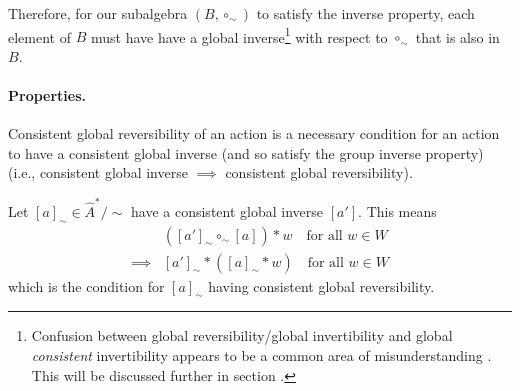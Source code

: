 Therefore, for our subalgebra $(B, \circ_{\sim})$ to satisfy the inverse property, each element of $B$ must have have a global inverse\footnote{
Confusion between global reversibility/global invertibility and global \emph{consistent} invertibility appears to be a common area of misunderstanding .
This will be discussed further in section .
} with respect to $\circ_{\sim}$ that is also in $B$.

\paragraph{Properties. }

\begin{propositionE}\label{prp:consistent_global_reversibility_necessary_for_consistent_global_inverse}
    Consistent global reversibility of an action is a necessary condition for an action to have a consistent global inverse (and so satisfy the group inverse property)
    (i.e., consistent global inverse $\implies$ consistent global reversibility).
\end{propositionE}
\begin{proofE}
    Let $[a]_{\sim} \in \hat{A}^{*}/\sim$ have a consistent global inverse $[a']$.
    This means
    \begin{align}
        & ([a']_{\sim} \circ_{\sim} [a]) \ast w \quad \text{for all $w \in W$} \\
        \implies & [a']_{\sim} \ast ([a]_{\sim} \ast w) \quad \text{for all $w \in W$}
    \end{align}
    which is the condition for $[a]_{\sim}$ having consistent global reversibility.
\end{proofE}

